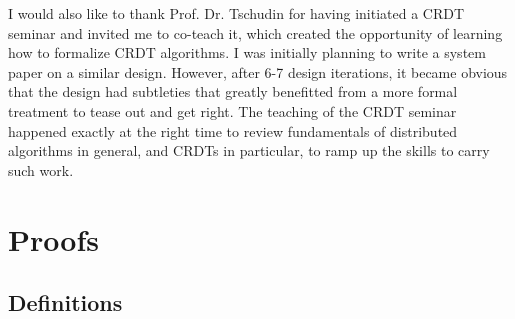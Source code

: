 \documentclass[9pt, oneside]{article}   	%
\begin{document}
I would also like to thank Prof. Dr. Tschudin for having initiated a CRDT seminar and invited me to co-teach it, which created the opportunity of learning how to formalize CRDT algorithms. I was initially planning to write a system paper on a similar design. However, after 6-7 design iterations, it became obvious that the design had subtleties that greatly benefitted from a more formal treatment to tease out and get right. The teaching of the CRDT seminar happened exactly at the right time to review fundamentals of distributed algorithms in general, and CRDTs in particular, to ramp up the skills to carry such work.



\newpage




\newpage
\appendix

\section{Proofs}
\label{sec:proofs}

\subsection{Definitions}
\end{document}
